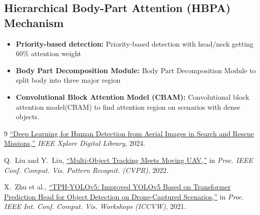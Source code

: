 \documentclass[12pt,a4paper]{report}
\begin{document}
\subsection{Hierarchical Body-Part Attention (HBPA) Mechanism}
\begin{itemize}
\item \textbf{Priority-based detection:} Priority-based detection with head/neck getting 60\% attention weight
\item \textbf{Body Part Decomposition Module:} Body Part Decomposition Module to split body into three major region
\item \textbf{Convolutional Block Attention Model (CBAM):} Convolutional block attention model(CBAM) to find attention region on scenarios with dense objects.
\end{itemize}

\AtBeginDocument{\renewcommand{\bibname}{References}}
\begin{thebibliography}{9}
\href{https://ieeexplore.ieee.org/document/10878144}{``Deep Learning for Human Detection from Aerial Images in Search and Rescue Missions,''} 
\textit{IEEE Xplore Digital Library}, 2024.

Q.~Liu and Y.~Liu, 
\href{https://openaccess.thecvf.com/content/CVPR2022/papers/Liu_Multi-Object_Tracking_Meets_Moving_UAV_CVPR_2022_paper.pdf}{``Multi-Object Tracking Meets Moving UAV,''} 
in \textit{Proc. IEEE Conf. Comput. Vis. Pattern Recognit. (CVPR)}, 2022.

X.~Zhu et al., 
\href{https://openaccess.thecvf.com/content/ICCV2021W/VisDrone/papers/Zhu_TPH-YOLOv5_Improved_YOLOv5_Based_on_Transformer_Prediction_Head_for_Object_ICCVW_2021_paper.pdf}{``TPH-YOLOv5: Improved YOLOv5 Based on Transformer Prediction Head for Object Detection on Drone-Captured Scenarios,''} 
in \textit{Proc. IEEE Int. Conf. Comput. Vis. Workshops (ICCVW)}, 2021.



\end{thebibliography}
\end{document}
